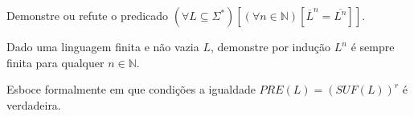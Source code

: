 \begin{problem}\label{prob:Linguagem6}
	Demonstre ou refute o predicado $(\forall L \subseteq \Sigma^*)[(\forall n \in \mathbb{N})[\overline{L}^n = \overline{L^n}]]$.
\end{problem}

\begin{problem}\label{prob:Linguagem7}
	Dado uma linguagem finita e não vazia $L$, demonstre por indução $L^n$ é sempre finita para qualquer $n \in \mathbb{N}$.
\end{problem}

\begin{problem}\label{prob:Linguagem8}
	Esboce formalmente em que condições a igualdade $PRE(L) = (SUF(L))^r$ é verdadeira.
\end{problem}